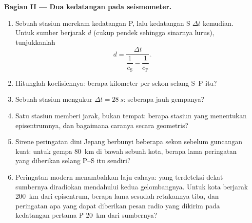 \begin{problem}
\medskip\noindent\textbf{Bagian II --- Dua kedatangan pada seismometer.}
\begin{enumerate}[resume]
  \item Sebuah stasiun merekam kedatangan P, lalu kedatangan S $\Delta t$
        kemudian. Untuk sumber berjarak $d$ (cukup pendek sehingga
        sinarnya lurus), tunjukkanlah
        \[
        d = \frac{\Delta t}{\dfrac{1}{c_{\text{S}}} -
        \dfrac{1}{c_{\text{P}}}} .
        \]
  \item Hitunglah koefisiennya: berapa kilometer per sekon selang
        S--P itu?
  \item Sebuah stasiun mengukur $\Delta t = \qty{28}{s}$: seberapa jauh
        gempanya?
  \item Satu stasiun memberi jarak, bukan tempat: berapa stasiun yang
        menentukan episentrumnya, dan bagaimana caranya secara geometris?
  \item Sirene peringatan dini Jepang berbunyi beberapa sekon sebelum
        guncangan kuat: untuk gempa \qty{80}{km} di bawah sebuah kota,
        berapa lama peringatan yang diberikan selang P--S itu sendiri?
  \item Peringatan modern menambahkan laju cahaya:  yang
        terdeteksi dekat sumbernya diradiokan mendahului kedua
        gelombangnya. Untuk kota berjarak \qty{200}{km} dari
        episentrum, berapa lama sesudah retakannya  tiba,
        dan peringatan apa yang dapat diberikan pesan radio yang
        dikirim pada kedatangan pertama P \qty{20}{km} dari sumbernya?
\end{enumerate}


\end{problem}

